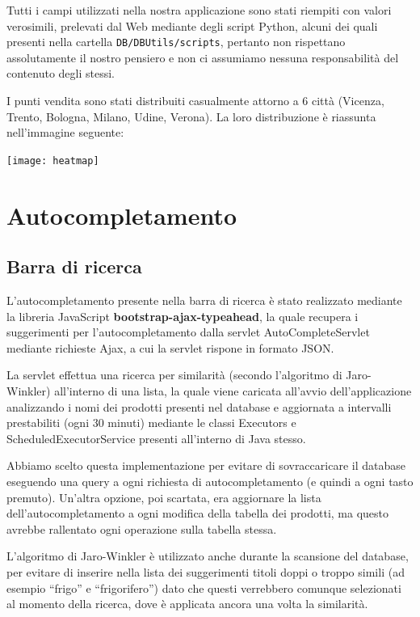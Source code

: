 Tutti i campi utilizzati nella nostra applicazione sono stati riempiti con valori verosimili, prelevati dal Web mediante degli script Python, alcuni dei quali presenti nella cartella \texttt{DB/DBUtils/scripts}, pertanto non rispettano assolutamente il nostro pensiero e non ci assumiamo nessuna responsabilità del contenuto degli stessi.

I punti vendita sono stati distribuiti casualmente attorno a 6 città (Vicenza, Trento, Bologna, Milano, Udine, Verona). La loro distribuzione è riassunta nell'immagine seguente:
\begin{center}
  \texttt{[image: heatmap]}
\end{center}


\chapter{Autocompletamento}

\section{Barra di ricerca}
L'autocompletamento presente nella barra di ricerca è stato realizzato mediante la libreria JavaScript  \textbf{bootstrap-ajax-typeahead}, la quale recupera i suggerimenti per l'autocompletamento dalla servlet AutoCompleteServlet mediante richieste Ajax, a cui la servlet rispone in formato JSON.

La servlet effettua una ricerca per similarità (secondo l'algoritmo di Jaro-Winkler) all'interno di una lista, la quale viene caricata all'avvio dell'applicazione analizzando i nomi dei prodotti presenti nel database e aggiornata a intervalli prestabiliti (ogni 30 minuti) mediante le classi Executors e ScheduledExecutorService presenti all'interno di Java stesso.

Abbiamo scelto questa implementazione per evitare di sovraccaricare il database eseguendo una query a ogni richiesta di autocompletamento (e quindi a ogni tasto premuto).
Un'altra opzione, poi scartata, era aggiornare la lista dell'autocompletamento a ogni modifica della tabella dei prodotti, ma questo avrebbe rallentato ogni operazione sulla tabella stessa.

L'algoritmo di Jaro-Winkler è utilizzato anche durante la scansione del database, per evitare di inserire nella lista dei suggerimenti titoli doppi o troppo simili (ad esempio ``frigo'' e ``frigorifero'') dato che questi verrebbero comunque selezionati al momento della ricerca, dove è applicata ancora una volta la similarità.

